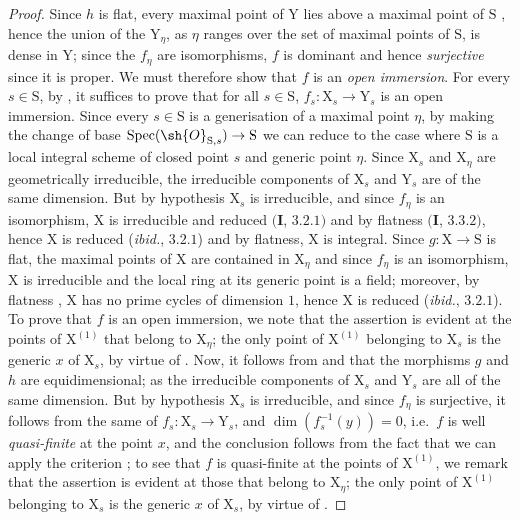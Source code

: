 \begin{proof}
Since $h$ is flat, every maximal point of $\mathrm{Y}$ lies above a maximal point of $\mathrm{S}$ , hence the union of the $\mathrm{Y}_\eta$, as $\eta$ ranges over the set of maximal points of $\mathrm{S}$, is dense in $\mathrm{Y}$; since the $f_\eta$ are isomorphisms, $f$ is dominant and hence \emph{surjective} since it is proper.
We must therefore show that $f$ is an \emph{open immersion}.
For every $s\in\mathrm{S}$, by , it suffices to prove that for all $s\in\mathrm{S}$, $f_s:\mathrm{X}_s\to\mathrm{Y}_s$ is an open immersion.
Since every $s\in\mathrm{S}$ is a generisation of a maximal point $\eta$, by making the change of base $\operatorname{Spec}(\sh{O}_{\mathrm{S},s})\to\mathrm{S}$ we can reduce to the case where $\mathrm{S}$ is a local integral scheme of closed point $s$ and generic point $\eta$.
Since $\mathrm{X}_s$ and $\mathrm{X}_\eta$ are geometrically irreducible, the irreducible components of $\mathrm{X}_s$ and $\mathrm{Y}_s$ are of the same dimension.
But by hypothesis $\mathrm{X}_s$ is irreducible, and since $f_\eta$ is an isomorphism, $\mathrm{X}$ is irreducible and reduced $(\mathbf{I}$, $3.2.1)$ and by flatness $(\mathbf{I}$, $3.3.2)$, hence $\mathrm{X}$ is reduced (\emph{ibid.}, $3.2.1$) and by flatness, $\mathrm{X}$ is integral.
Since $g:\mathrm{X}\to\mathrm{S}$ is flat, the maximal points of $\mathrm{X}$ are contained in $\mathrm{X}_\eta$  and since $f_\eta$ is an isomorphism, $\mathrm{X}$ is irreducible and the local ring at its generic point is a field; moreover, by flatness , $\mathrm{X}$ has no prime cycles of dimension $1$, hence $\mathrm{X}$ is reduced (\emph{ibid.}, $3.2.1$).
To prove that $f$ is an open immersion, we note that the assertion is evident at the points of $\mathrm{X}^{(1)}$ that belong to $\mathrm{X}_\eta$; the only point of $\mathrm{X}^{(1)}$ belonging to $\mathrm{X}_s$ is the generic $x$ of $\mathrm{X}_s$, by virtue of .
Now, it follows from  and  that the morphisms $g$ and $h$ are equidimensional; as the irreducible components of $\mathrm{X}_s$ and $\mathrm{Y}_s$ are all of the same dimension.
But by hypothesis $\mathrm{X}_s$ is irreducible, and since $f_\eta$ is surjective, it follows from the same of $f_s:\mathrm{X}_s\to\mathrm{Y}_s$, and $\dim(f_s^{-1}(y))=0$, i.e.\ $f$ is well \emph{quasi-finite} at the point $x$, and the conclusion follows from the fact that we can apply the criterion ; to see that $f$ is quasi-finite at the points of $\mathrm{X}^{(1)}$, we remark that the assertion is evident at those that belong to $\mathrm{X}_\eta$; the only point of $\mathrm{X}^{(1)}$ belonging to $\mathrm{X}_s$ is the generic $x$ of $\mathrm{X}_s$, by virtue of .

\end{proof}
